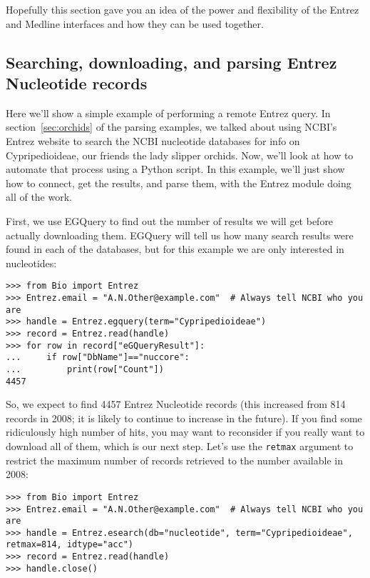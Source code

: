 Hopefully this section gave you an idea of the power and flexibility of the Entrez and Medline interfaces and how they can be used together.

\subsection{Searching, downloading, and parsing Entrez Nucleotide records}
\label{sec:entrez_example_genbank}

Here we'll show a simple example of performing a remote Entrez query. In section~\ref{sec:orchids} of the parsing examples, we talked about using NCBI's Entrez website to search the NCBI nucleotide databases for info on Cypripedioideae, our friends the lady slipper orchids. Now, we'll look at how to automate that process using a Python script. In this example, we'll just show how to connect, get the results, and parse them, with the Entrez module doing all of the work.

First, we use EGQuery to find out the number of results we will get before actually downloading them.  EGQuery will tell us how many search results were found in each of the databases, but for this example we are only interested in nucleotides:
\begin{verbatim}
>>> from Bio import Entrez
>>> Entrez.email = "A.N.Other@example.com"  # Always tell NCBI who you are
>>> handle = Entrez.egquery(term="Cypripedioideae")
>>> record = Entrez.read(handle)
>>> for row in record["eGQueryResult"]:
...     if row["DbName"]=="nuccore":
...         print(row["Count"])
4457
\end{verbatim}

So, we expect to find 4457 Entrez Nucleotide records (this increased from 814 records in 2008; it is likely to continue to increase in the future). If you find some ridiculously high number of hits, you may want to reconsider if you really want to download all of them, which is our next step. 
Let's use the \verb+retmax+ argument to restrict the maximum number of records retrieved to the number available in 2008:

\begin{verbatim}
>>> from Bio import Entrez
>>> Entrez.email = "A.N.Other@example.com"  # Always tell NCBI who you are
>>> handle = Entrez.esearch(db="nucleotide", term="Cypripedioideae", retmax=814, idtype="acc")
>>> record = Entrez.read(handle)
>>> handle.close()
\end{verbatim}

